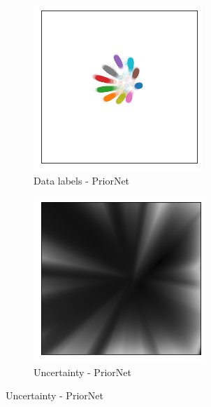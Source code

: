 \begin{figure}[t!]
    \centering
    \begin{subfigure}[t]{0.23 \columnwidth}
        \centering
        \includegraphics[width=0.8 \textwidth]{figures/2D_latent_klpn_2.png}
         \caption{Data labels - PriorNet}
         \label{KLPN_visualization_2D}
    \end{subfigure}%
    \begin{subfigure}[t]{0.23\columnwidth}
        \centering
        \includegraphics[width=0.8 \textwidth]{figures/2D_latent_klpn_1.png}
        \caption{Uncertainty - PriorNet}
        \label{KLPN_visualization_unc}
    \end{subfigure}%

\end{figure}
